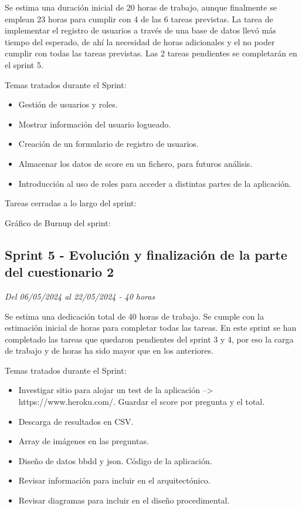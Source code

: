 Se estima una duración inicial de 20 horas de trabajo, aunque finalmente se emplean 23 horas para cumplir con 4 de las 6 tareas previstas.
La tarea de implementar el registro de usuarios a través de una base de datos llevó más tiempo del esperado, de ahí la necesidad de horas adicionales y el no poder cumplir con todas las tareas previstas.
Las 2 tareas pendientes se completarán en el sprint 5.

Temas tratados durante el Sprint:
\begin{itemize}
	\item
	Gestión de usuarios y roles.
	\item
	Mostrar información del usuario logueado.
	\item
	Creación de un formulario de registro de usuarios.
	\item
	Almacenar los datos de score en un fichero, para futuros análisis.
	\item
	Introducción al uso de roles para acceder a distintas partes de la aplicación.
\end{itemize}

Tareas cerradas a lo largo del sprint:

Gráfico de Burnup del sprint:

\subsection{Sprint 5 - Evolución y finalización de la parte del cuestionario 2}
\textit{Del 06/05/2024 al 22/05/2024 - 40 horas}

Se estima una dedicación total de 40 horas de trabajo.
Se cumple con la estimación inicial de horas para completar todas las tareas.
En este sprint se han completado las tareas que quedaron pendientes del sprint 3 y 4, por eso la carga de trabajo y de horas ha sido mayor que en los anteriores.

Temas tratados durante el Sprint:

\begin{itemize}
	\item
	Investigar sitio para alojar un test de la aplicación --> https://www.heroku.com/.
	Guardar el score por pregunta y el total.
	\item
	Descarga de resultados en CSV.
	\item
	Array de imágenes en las preguntas.
	\item
	Diseño de datos bbdd y json. Código de la aplicación.
	\item
	Revisar información para incluir en el arquitectónico.
	\item
	Revisar diagramas para incluir en el diseño procedimental.
\end{itemize}

